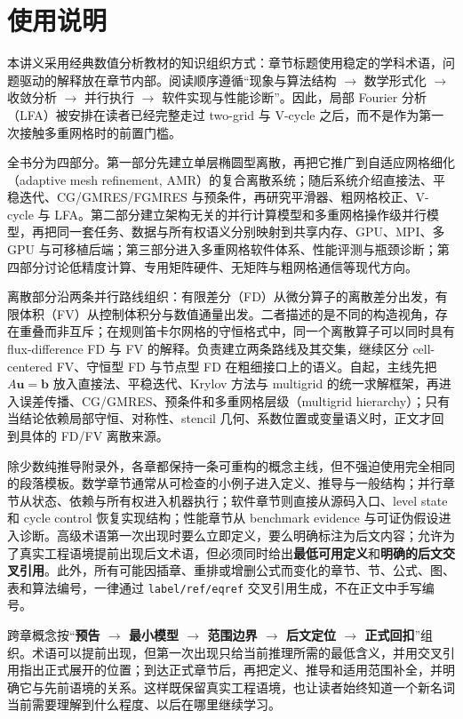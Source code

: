 \chapter*{使用说明}

本讲义采用经典数值分析教材的知识组织方式：章节标题使用稳定的学科术语，问题驱动的解释放在章节内部。阅读顺序遵循“现象与算法结构 $\rightarrow$ 数学形式化 $\rightarrow$ 收敛分析 $\rightarrow$ 并行执行 $\rightarrow$ 软件实现与性能诊断”。因此，局部 Fourier 分析（LFA）被安排在读者已经完整走过 two-grid 与 V-cycle 之后，而不是作为第一次接触多重网格时的前置门槛。

全书分为四部分。第一部分先建立单层椭圆型离散，再把它推广到自适应网格细化（adaptive mesh refinement, AMR）的复合离散系统；随后系统介绍直接法、平稳迭代、CG/GMRES/FGMRES 与预条件，再研究平滑器、粗网格校正、V-cycle 与 LFA。第二部分建立架构无关的并行计算模型和多重网格操作级并行模型，再把同一套任务、数据与所有权语义分别映射到共享内存、GPU、MPI、多 GPU 与可移植后端；第三部分进入多重网格软件体系、性能评测与瓶颈诊断；第四部分讨论低精度计算、专用矩阵硬件、无矩阵与粗网格通信等现代方向。

离散部分沿两条并行路线组织：有限差分（FD）从微分算子的离散差分出发，有限体积（FV）从控制体积分与数值通量出发。二者描述的是不同的构造视角，存在重叠而非互斥；在规则笛卡尔网格的守恒格式中，同一个离散算子可以同时具有 flux-difference FD 与 FV 的解释。负责建立两条路线及其交集，继续区分 cell-centered FV、守恒型 FD 与节点型 FD 在粗细接口上的语义。自起，主线先把 $A\bm u=\bm b$ 放入直接法、平稳迭代、Krylov 方法与 multigrid 的统一求解框架，再进入误差传播、CG/GMRES、预条件和多重网格层级（multigrid hierarchy）；只有当结论依赖局部守恒、对称性、stencil 几何、系数位置或变量语义时，正文才回到具体的 FD/FV 离散来源。

除少数纯推导附录外，各章都保持一条可重构的概念主线，但不强迫使用完全相同的段落模板。数学章节通常从可检查的小例子进入定义、推导与一般结构；并行章节从状态、依赖与所有权进入机器执行；软件章节则直接从源码入口、level state 和 cycle control 恢复实现结构；性能章节从 benchmark evidence 与可证伪假设进入诊断。高级术语第一次出现时要么立即定义，要么明确标注为后文内容；允许为了真实工程语境提前出现后文术语，但必须同时给出\textbf{最低可用定义}和\textbf{明确的后文交叉引用}。此外，所有可能因插章、重排或增删公式而变化的章节、节、公式、图、表和算法编号，一律通过 \texttt{label/ref/eqref} 交叉引用生成，不在正文中手写编号。

跨章概念按“\textbf{预告 $\rightarrow$ 最小模型 $\rightarrow$ 范围边界 $\rightarrow$ 后文定位 $\rightarrow$ 正式回扣}”组织。术语可以提前出现，但第一次出现只给当前推理所需的最低含义，并用交叉引用指出正式展开的位置；到达正式章节后，再把定义、推导和适用范围补全，并明确它与先前语境的关系。这样既保留真实工程语境，也让读者始终知道一个新名词当前需要理解到什么程度、以后在哪里继续学习。

